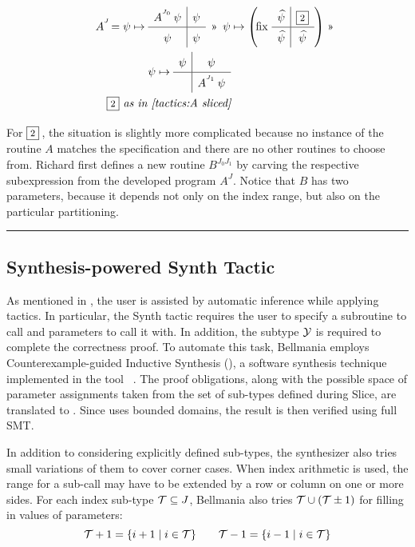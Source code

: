\begin{equation}
  \renewcommand\arraystretch{1.5}
  \begin{array}{@{} r @{} l @{}}
    A^{^J}\! = \psi\mapsto{} & \quadrants{A^{^{J_0}}\,\psi}{\psi}{\psi}{\psi} ~ \applt 
       ~\psi \mapsto \left(\!\fix\, \quadrants{\lifted\psi}{\qbox2}{\lifted\psi}{\lifted\psi}\right) \applt \\[5mm]
       & \psi \mapsto \quadrants{\psi}{\psi}{}{A^{^{J_1}}\,\psi} \\
    \lspan2{
     \quad
     \qbox2 \textit{ as in \Cref{tactics:A sliced}}
    }
  \end{array}
  \hspace{-5mm}
  \label{tactics:A synthed}
\end{equation}

For $\qbox2$\,, the situation is slightly more complicated because no instance of the routine
$A$ matches the specification and there are no other routines to choose from.
Richard first defines a new routine $B^{J_0J_1}$ by carving the respective
subexpression from the developed program $A^J$.
Notice that $B$ has two parameters, because it depends not only on the index
range, but also on the particular partitioning.

\medskip
\hrule

\subsection{Synthesis-powered {\sf Synth} Tactic}
\label{tactics:synthesis}

As mentioned in , the user is assisted by automatic
inference while applying tactics. In particular, the {\sf Synth} tactic requires
the user to specify a subroutine to call and parameters to call it with.
In addition, the subtype $\mathcal{Y}$ is required to complete the correctness proof.
To automate this task, Bellmania employs Counterexample-guided Inductive Synthesis ({\cegis}), a software synthesis technique
implemented in the tool {\Sketch}~\cite{STTT13/Solar-Lezama}. The proof obligations, along with the possible
space of parameter assignments taken from the set of sub-types defined during
{\sf Slice}, are translated to {\Sketch}. Since {\Sketch} uses bounded domains,
the result is then verified using full SMT.

In addition to considering explicitly defined sub-types, the synthesizer also tries
small variations of them to cover corner cases. When index arithmetic is used,
the range for a sub-call may have to be extended by a row or column on one or more sides.
For each index sub-type $\mathcal{T}\subseteq J$, Bellmania also tries $\mathcal{T}\cup(\mathcal{T}\pm 1)$ for filling in values of parameters:
\[\mathcal{T}+1=\{i+1\;|\;i\in \mathcal{T}\} \qquad \mathcal{T}-1=\{i-1\;|\;i\in \mathcal{T}\}\]

